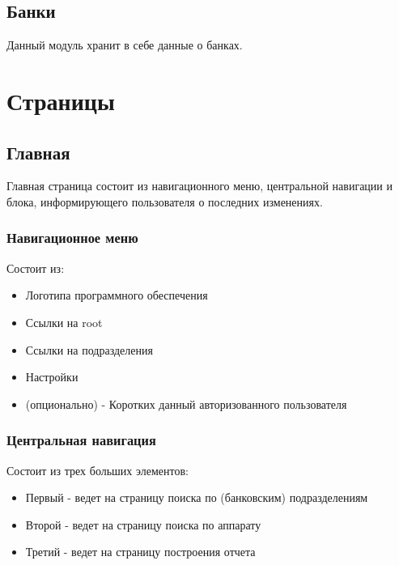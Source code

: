 \documentclass[DIV=calc, paper=a4, fontsize=11pt]{scrartcl} %
\begin{document}
\subsection{Банки}

Данный модуль хранит в себе данные о банках. 


\section{Страницы}

\subsection{Главная}

Главная страница состоит из навигационного меню, центральной навигации и блока, информирующего пользователя о последних изменениях.

\subsubsection{Навигационное меню}

Состоит из:
\begin{itemize}
	\item Логотипа программного обеспечения
	\item Ссылки на root
	\item Ссылки на подразделения
	\item Настройки
	\item (опционально) - Коротких данный авторизованного пользователя
\end{itemize}

\subsubsection{Центральная навигация}
Состоит из трех больших элементов:
\begin{itemize}
	\item Первый - ведет на страницу поиска по (банковским) подразделениям
	\item Второй - ведет на страницу поиска по аппарату
	\item Третий - ведет на страницу построения отчета
\end{itemize}
\end{document}
